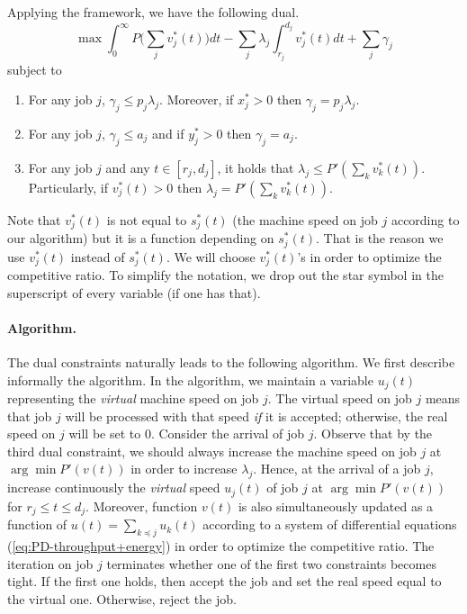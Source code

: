 \documentclass[11pt]{article}
\begin{document}
Applying the framework, we have the following dual.
$$
\max \int_{0}^{\infty} P\biggl(\sum_{j} v^{*}_{j}(t) \biggl)dt - \sum_{j} \lambda_{j} \int_{r_{j}}^{d_{j}} v^{*}_{j}(t)dt 
	+ \sum_{j} \gamma_{j}
$$
subject to
\begin{enumerate}
	\item For any job $j$, $\gamma_{j} \leq p_{j}\lambda_{j}$. 
	Moreover,  if $x^{*}_{j} > 0$ then $\gamma_{j} = p_{j}\lambda_{j}$. 
	\item For any job $j$, $\gamma_{j} \leq a_{j}$ and  if $y^{*}_{j} > 0$ then $\gamma_{j} = a_{j}$.
	\item For any job $j$ and any $t \in [r_{j},d_{j}]$, it holds that 
	$\lambda_{j} \leq P'(\sum_{k} v^{*}_{k}(t))$. 
	Particularly, if $v^{*}_{j}(t) > 0$ then $\lambda_{j} = P'(\sum_{k} v^{*}_{k}(t))$. 
\end{enumerate}
Note that $v^{*}_{j}(t)$ is not equal to $s^{*}_{j}(t)$ (the machine speed on job $j$ according to our algorithm) 
but it is a function depending on $s^{*}_{j}(t)$. That is the reason we use $v^{*}_{j}(t)$ instead of $s^{*}_{j}(t)$.
We will choose $v^{*}_{j}(t)$'s in order to optimize the competitive ratio. To simplify the notation, we drop out 
the star symbol in the superscript of every variable (if one has that). 

\paragraph{Algorithm.} The dual constraints naturally leads to the following algorithm. We first describe
informally the algorithm. 
In the algorithm, we maintain a variable $u_{j}(t)$ representing the 
\emph{virtual} machine speed on job $j$. The virtual speed on job $j$ means 
that job $j$ will be processed with that speed \emph{if} it is accepted; otherwise, 
the real speed on $j$ will be set to 0. 
Consider the arrival of job $j$. Observe that by the third dual constraint, 
we should always increase the machine speed on job $j$
at $\arg \min P'(v(t))$ in order to increase $\lambda_{j}$.
Hence, at the arrival of a job $j$, increase continuously the \emph{virtual} 
speed $u_{j}(t)$ of job $j$ at $\arg \min P'(v(t))$ for $r_{j} \leq t \leq d_{j}$.
Moreover, function $v(t)$ is also simultaneously 
updated as a function of $u(t) = \sum_{k \preceq j} u_{k}(t)$ 
according to a system of differential equations
(\ref{eq:PD-throughput+energy}) in order to optimize the competitive ratio.
The iteration on job $j$ terminates whether one of the first two constraints becomes tight. 
If the first one holds, then accept the job and set the real speed equal to 
the virtual one. Otherwise, reject the job.
\end{document}
